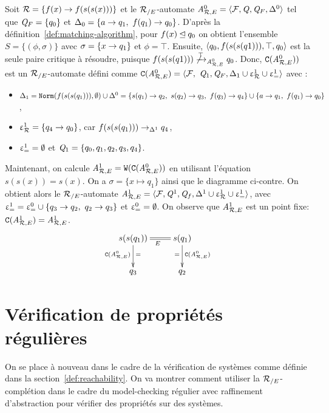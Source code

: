 \begin{example}
  \label{ex:W}
  Soit $\mathcal R = \{f(x) \rightarrow f(s(s(x)))\}$ et le ${\mathcal R_{/E}}$-automate
  ${\mathit A}_{\mathcal R,E}^0 = \langle\mathcal{F},\mathit Q,\mathit Q_F,\Delta^0\rangle$ tel que $\mathit Q_F = \{q_0\}$
  et $\Delta_0 = \{a \rightarrow q_1,\ f(q_1) \rightarrow q_0\}$.
  D'après la définition~\ref{def:matching-algorithm}, pour $f(x) \unlhd q_0$ on obtient l'ensemble $S = \{(\phi,\sigma)\}$
  avec $\sigma = \{x \rightarrow q_1\}$ et $\phi = \top$. Ensuite,
  $\langle q_0, f(s(s(q1))), \top, q_0\rangle$ est la seule paire critique à résoudre, puisque 
  $f(s(s(q1))) \not\xrightarrow{\top}_{{\mathit A}_{\mathcal R,E}^0} q_0$. Donc, $\mathtt{C}({\mathit A}_{\mathcal R,E}^0))$ est un ${\mathcal R_{/E}}$-automate défini comme
  $\mathtt{C}({\mathit A}_{\mathcal R,E}^0) = \langle\mathcal{F},\ \mathit Q_1, \mathit Q_F, \Delta_1 \cup \upvarepsilon_{\mathcal R}^1 \cup \upvarepsilon_{=}^1 \rangle$ avec :
  \begin{itemize}
  \item  $\Delta_1 = \mathtt{Norm}(f(s(s(q_1))),\emptyset) \cup \Delta^0 =
    \{s(q_1) \rightarrow q_2,\ s(q_2) \rightarrow q_3,\ f(q_3) \rightarrow q_4\} \cup \{a \rightarrow q_1,\ f(q_1) \rightarrow q_0\}$,
  \item
    $\upvarepsilon_{\mathcal R}^1 = \{q_4 \rightarrow q_0\}$, car $f(s(s(q_1))) \rightarrow_{\Delta^1} q_4$,
  \item $\upvarepsilon_{=}^1 = \emptyset$ et $\mathit Q_1 = \{q_0,q_1,q_2,q_3,q_4\}$.
  \end{itemize}

  Maintenant, on calcule ${\mathit A}_{\mathcal R,E}^1 = \mathtt{W}(\mathtt{C}({\mathit A}_{\mathcal R,E}^0))$ en utilisant l'équation
  $s(s(x))=s(x)$.  On a $\sigma=\{x \mapsto q_1\}$ ainsi que le diagramme ci-contre.
  On obtient alors le ${\mathcal R_{/E}}$-automate ${\mathit A}_{\mathcal R,E}^1 = \langle \mathcal{F}, \mathit Q^1, \mathit Q_f, \Delta^1 \cup \upvarepsilon_{\mathcal R}^1 \cup \upvarepsilon_{=}^1\rangle$,
  avec $\upvarepsilon_{=}^1= \upvarepsilon_{=}^0 \cup \{q_3 \rightarrow q_2,\ q_2 \rightarrow q_3\}$ et $\upvarepsilon_{=}^0=\emptyset$.  On observe que ${\mathit A}_{\mathcal R,E}^1$
  est un point fixe: $\mathtt{C}({\mathit A}_{\mathcal R,E}^1) = {\mathit A}_{\mathcal R,E}^1$.
  \[\xymatrix{
    s(s(q_1)) \ar@{=}[r]_{E}\ar[d]^{=}_{\compl(\aaexeq^0)} & s(q_1) \ar[d]^{\compl(\aaexeq^0)}_{=}\\
    q_3 & q_2
  }\]
\end{example}


\section{Vérification de propriétés régulières}
On se place à nouveau dans le cadre de la vérification de systèmes comme définie dans la section~\ref{def:reachability}.
On va montrer comment utiliser la ${\mathcal R_{/E}}$-complétion  dans le cadre du model-checking régulier 
avec raffinement d'abstraction pour vérifier des propriétés sur des systèmes.

